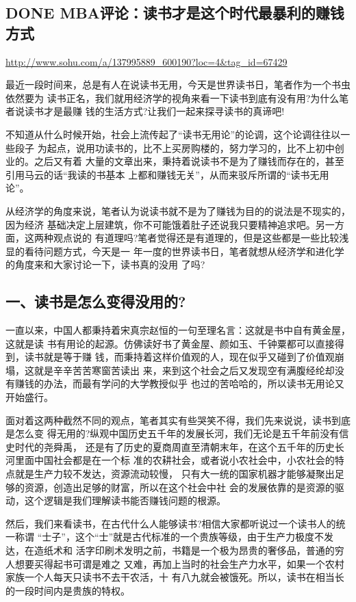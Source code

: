 \documentclass[11pt]{ctexart}
\begin{document}
{{{{\subsection{{\bfseries\sffamily DONE} MBA评论：读书才是这个时代最暴利的赚钱方式}
\label{sec:orgeae8c08}
\url{http://www.sohu.com/a/137995889\_600190?loc=4\&tag\_id=67429}

最近一段时间来，总是有人在说读书无用，今天是世界读书日，笔者作为一个书虫依然要为
读书正名，我们就用经济学的视角来看一下读书到底有没有用?为什么笔者说读书才是最赚
钱的生活方式?让我们一起来探寻读书的真谛吧!

不知道从什么时候开始，社会上流传起了“读书无用论”的论调，这个论调往往以一些段子
为起点，说用功读书的，比不上买房购楼的，努力学习的，比不上初中创业的。之后又有着
大量的文章出来，秉持着说读书不是为了赚钱而存在的，甚至引用马云的话“我读的书基本
上都和赚钱无关”，从而来驳斥所谓的“读书无用论”。

从经济学的角度来说，笔者认为说读书就不是为了赚钱为目的的说法是不现实的，因为经济
基础决定上层建筑，你不可能饿着肚子还说我只要精神追求吧。另一方面，这两种观点说的
有道理吗?笔者觉得还是有道理的，但是这些都是一些比较浅显的看待问题方式，今天是一
年一度的世界读书日，笔者就想从经济学和进化学的角度来和大家讨论一下，读书真的没用
了吗?

\subsection{一、读书是怎么变得没用的?}
\label{sec:orge603932}
一直以来，中国人都秉持着宋真宗赵恒的一句至理名言：这就是书中自有黄金屋，这就是读
书有用论的起源。仿佛读好书了黄金屋、颜如玉、千钟粟都可以直接得到，读书就是等于赚
钱，而秉持着这样价值观的人，现在似乎又碰到了价值观崩塌，这就是辛辛苦苦寒窗苦读出
来，来到这个社会之后又发现空有满腹经纶却没有赚钱的办法，而最有学问的大学教授似乎
也过的苦哈哈的，所以读书无用论又开始盛行。

面对着这两种截然不同的观点，笔者其实有些哭笑不得，我们先来说说，读书到底是怎么变
得无用的?纵观中国历史五千年的发展长河，我们无论是五千年前没有信史时代的尧舜禹，
还是有了历史的夏商周直至清朝末年，在这个五千年的历史长河里面中国社会都是在一个标
准的农耕社会，或者说小农社会中，小农社会的特点就是生产力较不发达，资源流动较慢，
只有大一统的国家机器才能够凝聚出足够的资源，创造出足够的财富，所以在这个社会中社
会的发展依靠的是资源的驱动，这个逻辑是我们理解读书能否赚钱问题的根源。

然后，我们来看读书，在古代什么人能够读书?相信大家都听说过一个读书人的统一称谓
“士子”，这个“士”就是古代标准的一个贵族等级，由于生产力极度不发达，在造纸术和
活字印刷术发明之前，书籍是一个极为昂贵的奢侈品，普通的穷人想要买得起书可谓是难之
又难，再加上当时的社会生产力水平，如果一个农村家族一个人每天只读书不去干农活，十
有八九就会被饿死。所以，读书在相当长的一段时间内是贵族的特权。

}}}}
\end{document}
